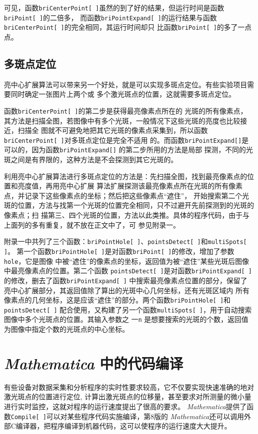\documentclass[UTF8,a4paper,12pt]{article}
\begin{document}
可见，函数\verb|briCenterPoint[ ]|虽然的到了好的结果，但运行时间是函数\verb|briPoint[ ]|的二倍多，
而函数\verb|briPointExpand[ ]|的运行结果与函数\verb|briCenterPoint[ ]|的完全相同，其运行时间却只
比函数\verb|briPoint[ ]|的多了一点点。

\subsection{多斑点定位}
亮中心扩展算法可以带来另一个好处，就是可以实现多斑点定位。有些实验项目需要同时确定一张图片上两个或
多个激光斑点的位置，这就需要多斑点定位。

函数\verb|briCenterPoint[ ]|的第二步是获得最亮像素点所在的
光斑的所有像素点，其方法是扫描全图，若图像中有多个光斑，一般情况下这些光斑的亮度也比较接近，扫描全
图就不可避免地把其它光斑的像素点采集到，所以函数\verb|briCenterPoint[ ]|对多斑点定位是完全不适用
的。而函数\verb|briPointExpand[]|是可以的，因为函数\verb|briPointExpand[]| 的第二步所用的方法是局部
探测，不同的光斑之间是有界限的，这种方法是不会探测到其它光斑的。

利用亮中心扩展算法进行多斑点定位的方法是：先扫描全图，找到最亮像素点的位置和亮度值，再用亮中心扩展
算法扩展探测该最亮像素点所在光斑的所有像素点，并记录下这些像素点的坐标；然后把这些像素点``遮住''，
开始搜索第二个光斑的位置，方法与找第一个光斑的位置完全相同，只不过避开先前探测到的光斑的像素点；扫
描第三、四个光斑的位置，方法以此类推。具体的程序代码，由于与上面列的多有重复，就不放在正文中了，可
参见附录一。

附录一中共列了三个函数：\verb|briPointHole[ ]|、\verb|pointsDetect[ ]|和\verb|multiSpots[ ]|。
第一个函数\verb|briPointHole[ ]|是对函数\verb|briPoint[ ]|的修改，增加了参数\verb|hole|，它是图像
中被``遮住''的像素点的坐标，返回值为被``遮住''某些光斑后图像中最亮像素点的位置。第二个函数
\verb|pointsDetect[ ]|是对函数\verb|briPointExpand[ ]|的修改，删去了函数\verb|briPointExpand[ ]|%
中搜索最亮像素点位置的部分，保留了亮中心扩展部分，其返回值除了算出的光斑中心几何坐标，还有光斑区域内
所有像素点的几何坐标，这是应该``遮住''的部分。两个函数\verb|briPointHole[ ]|和\verb|pointsDetect[ ]|
配合使用，又构建了另一个函数\verb|multiSpots[ ]|，用于自动搜索图像中多个光斑点的位置。其输入参数之
一\;\verb|n| 是想要搜索的光斑的个数，返回值为图像中指定个数的光斑点的中心坐标。

\section[Mathematica 中的代码编译]{\textit{Mathematica} 中的代码编译}
有些设备对数据采集和分析程序的实时性要求较高，它不仅要实现快速准确的地对激光斑点的位置进行定位,
计算出激光斑点的位移量，甚至要求对所测量的微小量进行实时监控，这就对程序的运行速度提出了很高的要求。
\textit{Mathematica}提供了函数\verb|Compile[ ]|可以对某些程序代码实施编译，第8版的
\textit{Mathematica}还可以调用外部C编译器，把程序编译到机器代码，这可以使程序的运行速度大大提升。
\end{document}
